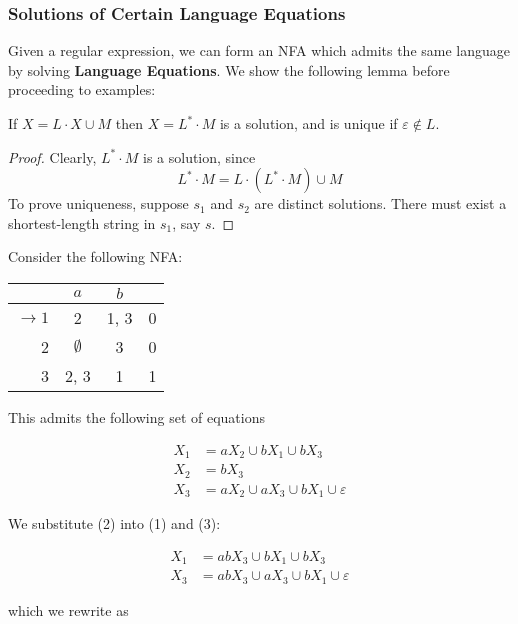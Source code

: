 \subsubsection{Solutions of Certain Language Equations}\label{subsubsec:solutions-of-certain-language-equations}

Given a regular expression, we can form an NFA which admits the same language by solving \textbf{Language Equations}. We show the following lemma before proceeding to examples:

\begin{lemma}
      If \(X=L\cdot X\cup M\) then \(X=L^*\cdot M\) is a solution, and is unique if \(\varepsilon\not\in L\). 
\end{lemma}

\begin{proof}
      Clearly, \(L^*\cdot M\) is a solution, since \[L^*\cdot M = L\cdot (L^*\cdot M)\cup M\] To prove uniqueness, suppose \(s_1\) and \(s_2\) are distinct solutions. There must exist a shortest-length string in \(s_1\), say \(s\). 
\end{proof}

Consider the following NFA\@:

\begin{center}\begin{tabular}{r c c r}
      & \(a\) & \(b\) & \\\bottomrule
      \(\to 1\) & 2 & 1, 3 & 0\\
            2 & \(\emptyset \) & 3 & 0\\
            3 & 2, 3 & 1 & 1
 \end{tabular}\end{center}

This admits the following set of equations 

\begin{align}
      X_1 &= aX_2\cup bX_1\cup bX_3\\
      X_2 &= bX_3\\
      X_3 &= aX_2\cup aX_3\cup bX_1\cup\varepsilon
\end{align}

We substitute (2) into (1) and (3):

\begin{align*}
      X_1 &= abX_3\cup bX_1\cup bX_3\\
      X_3 &= abX_3\cup aX_3\cup bX_1\cup\varepsilon
\end{align*}

which we rewrite as

